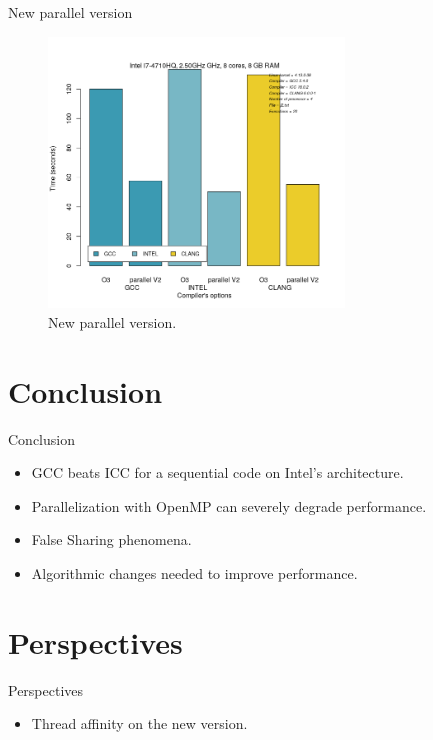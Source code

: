 \documentclass{beamer}
\begin{document}
\begin{frame}{New parallel version}
	\begin{figure}
      \includegraphics[width=0.7\textwidth]{parallel_v2.png}
      \caption{New parallel version.\label{Fig:trie}}
	\end{figure}
\end{frame}

\section{Conclusion}

\begin{frame}{Conclusion}
\begin{itemize}
	\item
	GCC beats ICC for a sequential code on Intel's architecture.
	\item
	Parallelization with OpenMP can severely degrade performance.
  \item
    False Sharing phenomena.
  \item
  	Algorithmic changes needed to improve performance.
 \end{itemize}	
\end{frame}

\section{Perspectives}

\begin{frame}{Perspectives}
\begin{itemize}
	\item
	Thread affinity on the new version.
 \end{itemize}	
\end{frame}
\end{document}
